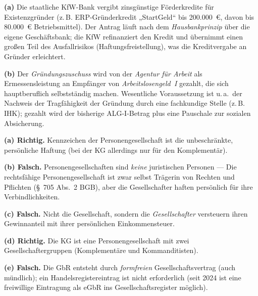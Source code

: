 \documentclass[11pt, a4paper]{article}
\begin{document}
\begin{loesung}[title={Lösung Aufgabe~4 --- Fördermöglichkeiten}]
\textbf{(a)} Die staatliche KfW-Bank vergibt zinsgünstige Förderkredite für
Existenzgründer (z.\,B. ERP-Gründerkredit „StartGeld`` bis 200.000~€, davon bis 80.000~€ Betriebsmittel). Der Antrag läuft
nach dem \emph{Hausbankprinzip} über die eigene Geschäftsbank; die KfW refinanziert den
Kredit und übernimmt einen großen Teil des Ausfallrisikos (Haftungsfreistellung), was die
Kreditvergabe an Gründer erleichtert.

\textbf{(b)} Der \emph{Gründungszuschuss} wird von der \emph{Agentur für Arbeit} als
Ermessensleistung an Empfänger von \emph{Arbeitslosengeld~I} gezahlt, die sich
hauptberuflich selbstständig machen. Wesentliche Voraussetzung ist u.\,a.\ der Nachweis
der Tragfähigkeit der Gründung durch eine fachkundige Stelle (z.\,B. IHK); gezahlt wird
der bisherige ALG-I-Betrag plus eine Pauschale zur sozialen Absicherung.
\end{loesung}

\begin{loesung}[title={Lösung Aufgabe~5 --- Personengesellschaften}]
\textbf{(a) Richtig.} Kennzeichen der Personengesellschaft ist die unbeschränkte,
persönliche Haftung (bei der KG allerdings nur für den Komplementär).

\textbf{(b) Falsch.} Personengesellschaften sind \emph{keine} juristischen Personen ---
Die rechtsfähige Personengesellschaft ist zwar selbst Trägerin von Rechten und
Pflichten (§~705 Abs.~2 BGB), aber die Gesellschafter haften persönlich für ihre
Verbindlichkeiten.

\textbf{(c) Falsch.} Nicht die Gesellschaft, sondern die \emph{Gesellschafter} versteuern
ihren Gewinnanteil mit ihrer persönlichen Einkommensteuer.

\textbf{(d) Richtig.} Die KG ist eine Personengesellschaft mit zwei Gesellschaftergruppen
(Komplementäre und Kommanditisten).

\textbf{(e) Falsch.} Die GbR entsteht durch \emph{formfreien} Gesellschaftsvertrag
(auch mündlich); ein Handelsregistereintrag ist nicht erforderlich (seit 2024 ist eine
freiwillige Eintragung als eGbR ins Gesellschaftsregister möglich).
\end{loesung}
\end{document}
